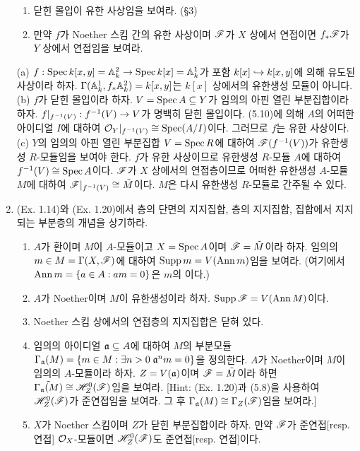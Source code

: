 \begin{enumerate}[label=\tb{5.\arabic*.},itemindent=0mm,itemsep=4mm]
\begin{enumerate}[label=(\alph*)]
	\item 닫힌 몰입이 유한 사상임을 보여라. (\S 3)
	\item 만약 $f$가 Noether 스킴 간의 유한 사상이며 $\mathscr{F}$가 $X$ 상에서 연접이면 $f_*\mathscr{F}$가 $Y$ 상에서 연접임을 보여라.
	\end{enumerate}
	\sol (a) $f:\operatorname{Spec} k[x,y]=\mathbb{A}_k^2\rightarrow\operatorname{Spec} k[x]=\mathbb{A}_k^1$가 포함 $k[x]\hookrightarrow k[x,y]$에 의해 유도된 사상이라 하자.
	$\Gamma(\mathbb{A}_k^1,f_*\mathbb{A}_k^2)=k[x,y]$는 $k[x]$ 상에서의 유한생성 모듈이 아니다.\\
	(b) $f$가 닫힌 몰입이라 하자. $V=\operatorname{Spec} A\subseteq Y$가 임의의 아핀 열린 부분집합이라 하자.
	$f|_{f^{-1}(V)}:f^{-1}(V)\rightarrow V$가 명백히 닫힌 몰입이다.
	(5.10)에 의해 $A$의 어떠한 아이디얼 $I$에 대하여 $\mathcal{O}_Y|_{f^{-1}(V)}\cong\operatorname{Spec}(A/I)$이다. 그러므로 $f$는 유한 사상이다.\\
	(c) $Y$의 임의의 아핀 열린 부분집합 $V=\operatorname{Spec} R$에 대하여 $\mathscr{F}(f^{-1}(V))$가 유한생성 $R$-모듈임을 보여야 한다.
	$f$가 유한 사상이므로 유한생성 $R$-모듈 $A$에 대하여 $f^{-1}(V)\cong\operatorname{Spec} A$이다.
	$\mathscr{F}$가 $X$ 상에서의 연접층이므로 어떠한 유한생성 $A$-모듈 $M$에 대하여 $\mathscr{F}|_{f^{-1}(V)}\cong\tilde M$이다.
	$M$은 다시 유한생성 $R$-모듈로 간주될 수 있다.
	\item {} (Ex. 1.14)와 (Ex. 1.20)에서 층의 단면의 지지집합, 층의 지지집합, 집합에서 지지되는 부분층의 개념을 상기하라.
	\begin{enumerate}[label=(\alph*)]
	\item $A$가 환이며 $M$이 $A$-모듈이고 $X=\operatorname{Spec} A$이며 $\mathscr{F}=\tilde M$이라 하자.
	임의의 $m\in M=\Gamma(X,\mathscr{F})$에 대하여 $\operatorname{Supp} m=V(\operatorname{Ann} m)$임을 보여라.
	(여기에서 $\operatorname{Ann} m=\{a\in A:am=0\}$은 $m$의 이다.)
	\item $A$가 Noether이며 $M$이 유한생성이라 하자. $\operatorname{Supp}\mathscr{F}=V(\operatorname{Ann} M)$이다.
	\item Noether 스킴 상에서의 연접층의 지지집합은 닫혀 있다.
	\item 임의의 아이디얼 $\mathfrak{a}\subseteq A$에 대하여 $M$의 부분모듈 $\Gamma_{\mathfrak{a}}(M)=\{m\in M:\exists n>0\;\mathfrak{a}^nm=0\}$을 정의한다.
	$A$가 Noether이며 $M$이 임의의 $A$-모듈이라 하자.
	$Z=V(\mathfrak{a})$이며 $\mathscr{F}=\tilde M$이라 하면 $\tilde{\Gamma_{\mathfrak{a}}(M)}\cong\mathscr{H}^0_Z(\mathscr{F})$임을 보여라.
	[Hint: (Ex. 1.20)과 (5.8)을 사용하여 $\mathscr{H}_Z^0(\mathscr{F})$가 준연접임을 보여라. 그 후 $\Gamma_{\mathfrak{a}}(M)\cong\Gamma_Z(\mathscr{F})$임을 보여라.]
	\item $X$가 Noether 스킴이며 $Z$가 닫힌 부분집합이라 하자.
	만약 $\mathscr{F}$가 준연접[resp. 연접] $\mathcal{O}_X$-모듈이면 $\mathscr{H}^0_Z(\mathscr{F})$도 준연접[resp. 연접]이다.

\end{enumerate}
\end{enumerate}
